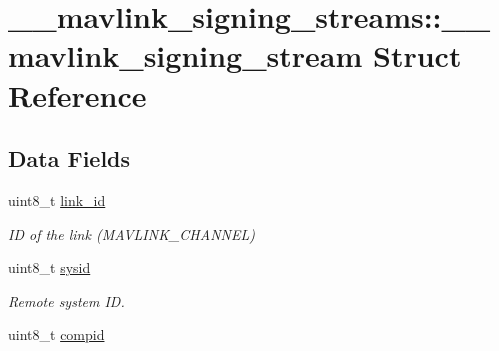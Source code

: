 \hypertarget{struct____mavlink__signing__streams_1_1____mavlink__signing__stream}{}\section{\+\_\+\+\_\+mavlink\+\_\+signing\+\_\+streams\+:\+:\+\_\+\+\_\+mavlink\+\_\+signing\+\_\+stream Struct Reference}
\label{struct____mavlink__signing__streams_1_1____mavlink__signing__stream}
\subsection*{Data Fields}
\begin{DoxyCompactItemize}
\item 
uint8\+\_\+t \hyperlink{struct____mavlink__signing__streams_1_1____mavlink__signing__stream_afbb4d42ec52ad6513f559fa17040a5df}{link\+\_\+id}\hypertarget{struct____mavlink__signing__streams_1_1____mavlink__signing__stream_afbb4d42ec52ad6513f559fa17040a5df}{}\label{struct____mavlink__signing__streams_1_1____mavlink__signing__stream_afbb4d42ec52ad6513f559fa17040a5df}

\begin{DoxyCompactList}\small\item\em ID of the link (M\+A\+V\+L\+I\+N\+K\+\_\+\+C\+H\+A\+N\+N\+EL) \end{DoxyCompactList}\item 
uint8\+\_\+t \hyperlink{struct____mavlink__signing__streams_1_1____mavlink__signing__stream_a0d0ce442f64be430b9bb3d7228f40695}{sysid}\hypertarget{struct____mavlink__signing__streams_1_1____mavlink__signing__stream_a0d0ce442f64be430b9bb3d7228f40695}{}\label{struct____mavlink__signing__streams_1_1____mavlink__signing__stream_a0d0ce442f64be430b9bb3d7228f40695}

\begin{DoxyCompactList}\small\item\em Remote system ID. \end{DoxyCompactList}\item 
uint8\+\_\+t \hyperlink{struct____mavlink__signing__streams_1_1____mavlink__signing__stream_aee962140202f5312c273a491abff438d}{compid}\hypertarget{struct____mavlink__signing__streams_1_1____mavlink__signing__stream_aee962140202f5312c273a491abff438d}{}\label{struct____mavlink__signing__streams_1_1____mavlink__signing__stream_aee962140202f5312c273a491abff438d}


\end{DoxyCompactItemize}
